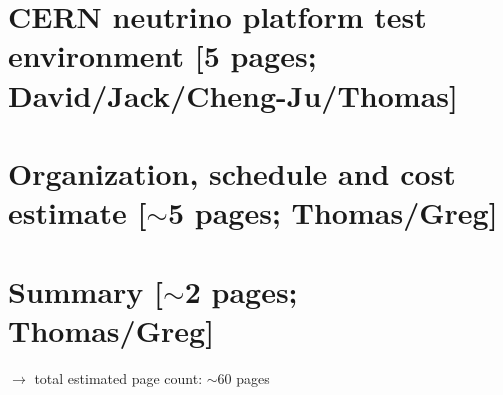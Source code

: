 \documentclass[12pt]{article}
\begin{document}
\section{CERN neutrino platform test environment [5 pages; {\color{red} David/Jack/Cheng-Ju/Thomas}]}
	
	
	
\section{Organization, schedule and cost estimate [$\sim$5 pages; {\color{red} Thomas/Greg}]}
	

\section{Summary [$\sim$2 pages; {\color{red} Thomas/Greg}]}
	




$\rightarrow$ total estimated page count: $\sim$60 pages
\end{document}
